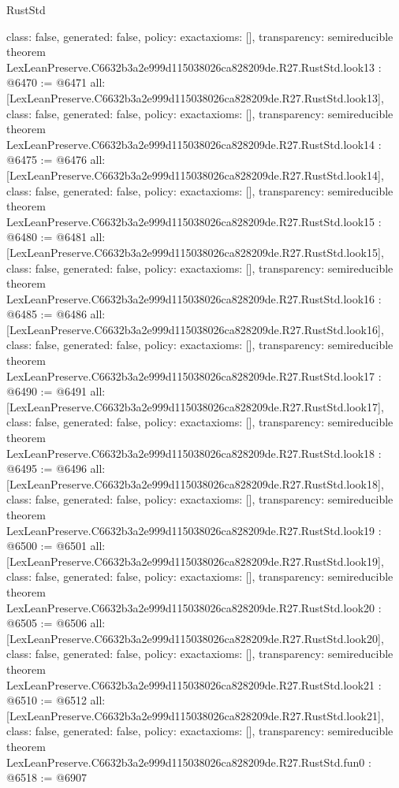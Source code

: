 \begin{lexlean}{RustStd}
\begin{coremodule}
{  class: false,
  generated: false,
  policy: exact{axioms: []},
  transparency: semireducible
}
theorem LexLeanPreserve.C6632b3a2e999d115038026ca828209de.R27.RustStd.look13 : @6470 := @6471 {
  all: [LexLeanPreserve.C6632b3a2e999d115038026ca828209de.R27.RustStd.look13],
  class: false,
  generated: false,
  policy: exact{axioms: []},
  transparency: semireducible
}
theorem LexLeanPreserve.C6632b3a2e999d115038026ca828209de.R27.RustStd.look14 : @6475 := @6476 {
  all: [LexLeanPreserve.C6632b3a2e999d115038026ca828209de.R27.RustStd.look14],
  class: false,
  generated: false,
  policy: exact{axioms: []},
  transparency: semireducible
}
theorem LexLeanPreserve.C6632b3a2e999d115038026ca828209de.R27.RustStd.look15 : @6480 := @6481 {
  all: [LexLeanPreserve.C6632b3a2e999d115038026ca828209de.R27.RustStd.look15],
  class: false,
  generated: false,
  policy: exact{axioms: []},
  transparency: semireducible
}
theorem LexLeanPreserve.C6632b3a2e999d115038026ca828209de.R27.RustStd.look16 : @6485 := @6486 {
  all: [LexLeanPreserve.C6632b3a2e999d115038026ca828209de.R27.RustStd.look16],
  class: false,
  generated: false,
  policy: exact{axioms: []},
  transparency: semireducible
}
theorem LexLeanPreserve.C6632b3a2e999d115038026ca828209de.R27.RustStd.look17 : @6490 := @6491 {
  all: [LexLeanPreserve.C6632b3a2e999d115038026ca828209de.R27.RustStd.look17],
  class: false,
  generated: false,
  policy: exact{axioms: []},
  transparency: semireducible
}
theorem LexLeanPreserve.C6632b3a2e999d115038026ca828209de.R27.RustStd.look18 : @6495 := @6496 {
  all: [LexLeanPreserve.C6632b3a2e999d115038026ca828209de.R27.RustStd.look18],
  class: false,
  generated: false,
  policy: exact{axioms: []},
  transparency: semireducible
}
theorem LexLeanPreserve.C6632b3a2e999d115038026ca828209de.R27.RustStd.look19 : @6500 := @6501 {
  all: [LexLeanPreserve.C6632b3a2e999d115038026ca828209de.R27.RustStd.look19],
  class: false,
  generated: false,
  policy: exact{axioms: []},
  transparency: semireducible
}
theorem LexLeanPreserve.C6632b3a2e999d115038026ca828209de.R27.RustStd.look20 : @6505 := @6506 {
  all: [LexLeanPreserve.C6632b3a2e999d115038026ca828209de.R27.RustStd.look20],
  class: false,
  generated: false,
  policy: exact{axioms: []},
  transparency: semireducible
}
theorem LexLeanPreserve.C6632b3a2e999d115038026ca828209de.R27.RustStd.look21 : @6510 := @6512 {
  all: [LexLeanPreserve.C6632b3a2e999d115038026ca828209de.R27.RustStd.look21],
  class: false,
  generated: false,
  policy: exact{axioms: []},
  transparency: semireducible
}
theorem LexLeanPreserve.C6632b3a2e999d115038026ca828209de.R27.RustStd.fun0 : @6518 := @6907 {
}
\end{coremodule}
\end{lexlean}
